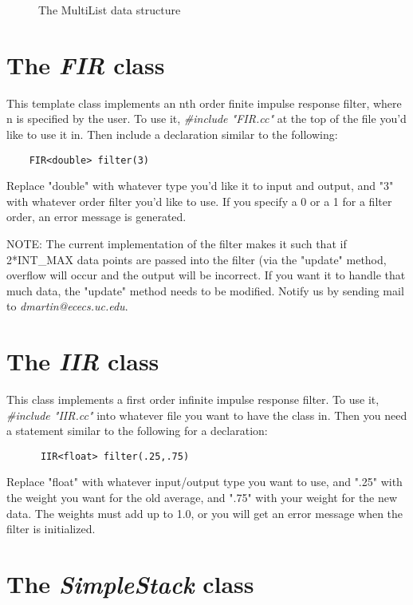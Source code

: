 \documentclass[11pt]{report}
\begin{document}
\begin{figure}
\centerline{}
\caption{The MultiList data structure}\label{fig:multilist}
\end{figure}

\section{The {\it FIR} class}

This template class implements an nth order finite impulse response
filter, where n is specified by the user.  To use it, {\it \#include
"FIR.cc"} at the top of the file you'd like to use it in.  Then include
a declaration similar to the following:

\begin{verbatim}
	FIR<double> filter(3)
\end{verbatim}

Replace "double" with whatever type you'd like it to input and output,
and "3" with whatever order filter you'd like to use.  If you specify a
0 or a 1 for a filter order, an error message is generated.

NOTE: The current implementation of the filter makes it such that if
2*INT\_MAX data points are passed into the filter (via the "update"
method, overflow will occur and the output will be incorrect.  If you
want it to handle that much data, the "update" method needs to be
modified. Notify us by sending mail to {\it dmartin@ececs.uc.edu}.

\section{The {\it IIR} class}

This class implements a first order infinite impulse response filter.
To use it, {\it \#include "IIR.cc"} into whatever file you want to have the
class in.  Then you need a statement similar to the following for a
declaration:

\begin{verbatim}
      IIR<float> filter(.25,.75)
\end{verbatim}

Replace "float" with whatever input/output type you want to use, and ".25"
with the weight you want for the old average, and ".75" with your weight
for the new data.  The weights must add up to 1.0, or you will get an
error message when the filter is initialized.

\section{The {\it SimpleStack} class}
\end{document}
